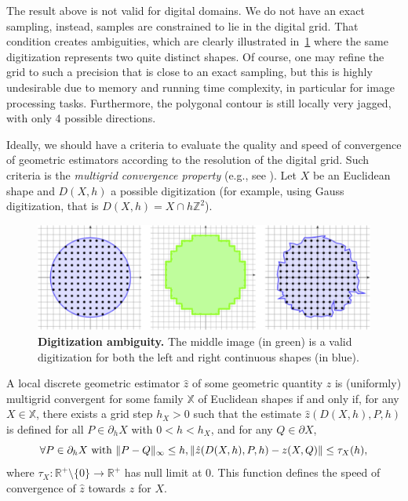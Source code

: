 \documentclass[review]{siamart220329}
\DeclarePairedDelimiter\norm{\lVert}{\rVert}%
\begin{document}
The result above is not valid for digital domains. We do not have an exact sampling, instead, samples are constrained to lie in the digital grid. That condition creates ambiguities, which are clearly illustrated in~\cref{fig:digitization-ambiguity} where the same digitization represents two quite distinct shapes. Of course, one may refine the grid to such a precision that is close to an exact sampling, but this is highly undesirable due to memory and running time complexity, in particular for image processing tasks. Furthermore, the polygonal contour is still locally very jagged, with only 4 possible directions.

Ideally, we should have a criteria to evaluate the quality and speed
of convergence of geometric estimators according to the resolution of
the digital grid. Such criteria is the \emph{multigrid convergence
property} (e.g., see \cite{klette2004digital}). Let $X$ be an Euclidean
shape and $D(X,h)$ a possible digitization (for example, using Gauss
digitization, that is $D(X,h) = X \cap h\mathbb{Z}^2$).
%
%
\begin{figure}
\center
\includegraphics[scale=1]{figures/ambiguity.png}
\caption{\textbf{Digitization ambiguity.} The middle image (in green) is a valid digitization for both the left and right continuous shapes (in blue).}
\label{fig:digitization-ambiguity}
\end{figure}
%
%
\begin{definition}
  A local discrete geometric estimator $\hat{z}$ of some geometric
  quantity $z$ is (uniformly) multigrid convergent for some family $\mathbb{X}$ of Euclidean shapes if
  and only if, for any $X \in \mathbb{X}$, there exists a grid step
  $h_X>0$ such that the estimate $\hat{z}(D(X,h), P,h)$ is
  defined for all $P \in \partial_hX$ with $ 0 < h < h_X$, and
  for any $Q \in \partial X$,
  \begin{equation*}
    \forall P \in  \partial_hX \text{ with } \norm{ P - Q }_{\infty} \leq h, \norm{ \hat{z}(D(X,h),P,h) - z(X,Q)} \leq \tau_{X}(h),			
  \end{equation*}
  where $\tau_{X}:\mathbb{R}^{+}\setminus\{0\} \rightarrow
  \mathbb{R}^{+}$ has null limit at $0$. This function defines the
  speed of convergence of $\hat{z}$ towards $z$ for $X$.
\end{definition}
	
\end{document}

